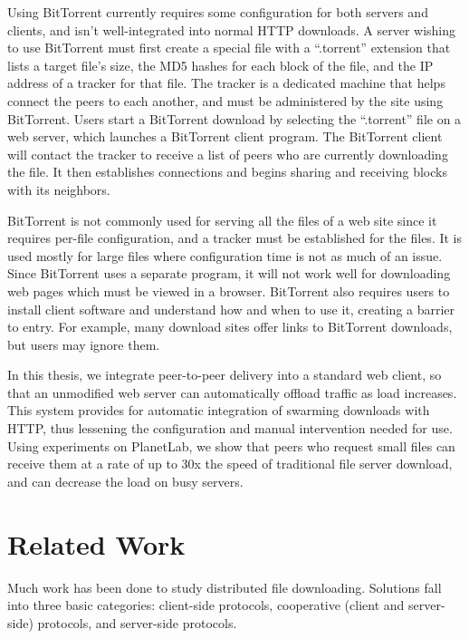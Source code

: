 Using BitTorrent currently requires some configuration for both servers and clients, and isn't well-integrated into normal HTTP downloads.  A server wishing to use BitTorrent 
must first create a special file with a ``.torrent'' extension that lists a target file's size, the MD5 hashes for each block of the file, and 
the IP address of a tracker for that file.  The tracker is a dedicated machine that helps connect the peers to each another, and must be administered
by the site using BitTorrent.  Users start a BitTorrent download by selecting the ``.torrent'' file on a web server, which launches a BitTorrent client program.
The BitTorrent client will contact the tracker to receive a list of peers who are currently downloading the file.  It then establishes connections and 
begins sharing and receiving blocks with its neighbors.


BitTorrent is not commonly used for serving all the files of a web site since it requires per-file configuration, and a tracker must be established for the files.  It is used mostly for large files where
configuration time is not as much of an issue.  Since BitTorrent uses a separate program, it will not work well for downloading web pages which must be viewed in a browser.  
BitTorrent also requires users to install client software and understand how and when to use it, creating a barrier to entry.  For example, many download sites offer links to BitTorrent downloads,
but users may ignore them.

In this thesis, we integrate peer-to-peer delivery into a standard web client, so that an unmodified web server can automatically offload traffic as load increases. 
This system provides for automatic integration of swarming downloads with HTTP, thus lessening the configuration and manual intervention needed for use.
Using experiments on PlanetLab, we show that peers who request small files can receive them at a rate of up to 30x the speed of traditional file server download, and
can decrease the load on busy servers.  

\chapter{Related Work}
Much work has been done to study distributed file downloading.  Solutions fall into three basic categories: client-side protocols, cooperative (client and server-side) protocols, 
and server-side protocols.


